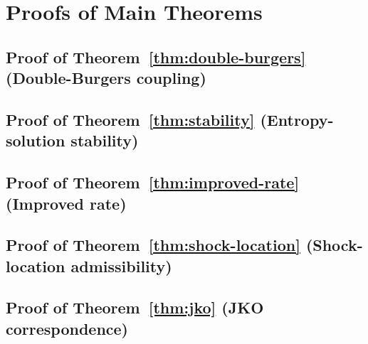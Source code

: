 %
\section{Proofs of Main Theorems}
\label{appx:proofs}

\subsection{Proof of Theorem~\ref{thm:double-burgers} (Double-Burgers coupling)}
\label{appx:proofs:thm1}


\subsection{Proof of Theorem~\ref{thm:stability} (Entropy-solution stability)}
\label{appx:proofs:thm2}


\subsection{Proof of Theorem~\ref{thm:improved-rate} (Improved rate)}
\label{appx:proofs:thm3}


\subsection{Proof of Theorem~\ref{thm:shock-location} (Shock-location admissibility)}
\label{appx:proofs:thm4}


\subsection{Proof of Theorem~\ref{thm:jko} (JKO correspondence)}
\label{appx:proofs:thm5}

